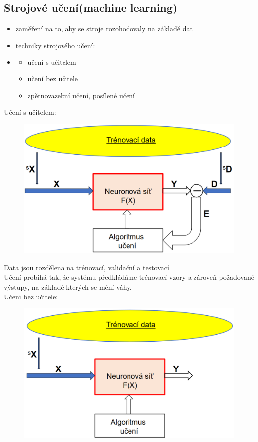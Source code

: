 \subsection*{Strojové učení(machine learning)}
\begin{itemize}
    \item zaměření na to, aby se stroje rozohodovaly na základě dat
    \item techniky strojového učení:
    \item \begin{itemize}
        \item učení s učitelem
        \item učení bez učitele
        \item zpětnovazební učení, posílené učení
    \end{itemize}
\end{itemize}
Učení s učitelem:
\label{typ_uceni}
\begin{figure}[H]
    \includegraphics[scale = 0.3]{images/sUcitelem.png}
\end{figure}
Data jsou rozdělena na trénovací, validační a testovací\\
Učení probíhá tak, že systému předkládáme trénovací vzory a zároveň požadované výstupy, na základě kterých se mění váhy.\\
\newpage
Učení bez učitele:
\begin{figure}[H]
    \includegraphics[scale = 0.4]{images/bezUcitele.png}
\end{figure}
